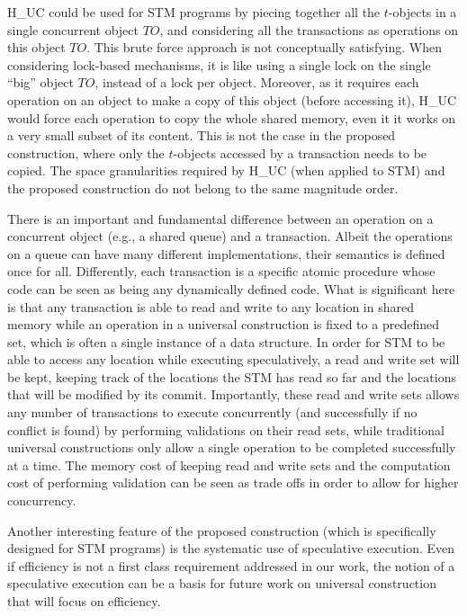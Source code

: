 H\_UC could be used for STM programs   by
piecing together  all the $t$-objects in a single concurrent object 
$\mathit{TO}$,  and  considering   all  the   transactions   as  operations
on this   object 
$\mathit{TO}$.  This  brute force approach is not conceptually satisfying.  
When considering lock-based mechanisms,   it is like using a single lock 
on  the single  ``big'' object $\mathit{TO}$, instead of a lock per object. 
Moreover, as it  requires each operation on an object to make a copy of 
this object   (before  accessing it),  H\_UC would force each  operation to
copy the whole  shared memory, even it  it works on a very  small subset of
its  content.  This is not the case in the proposed  construction, where
only  the $t$-objects accessed by a transaction needs to be copied. 
The space granularities required by  H\_UC (when applied to STM)  and 
the proposed construction do not belong to the same magnitude order.



There is an important and fundamental difference between an operation on 
a concurrent object (e.g.,  a shared queue) and a transaction. 
Albeit the operations on a queue can have many different implementations, 
their semantics is  defined once for all. 
Differently, each transaction is a specific  atomic procedure whose 
code can be  seen as being any dynamically  defined code.
What is significant here is that any transaction is  able to read and
write to  any location in shared  memory while an operation  in a universal
construction is fixed to a predefined set, which is often a single instance
of a  data structure.  In order  for STM to  be able to access 
 any location while executing speculatively,  a read and write set  will be
kept, keeping   track of the  locations  the STM  has read so far  and  the
locations that will be modified by  its commit.  
Importantly, these read  and write sets allows
any number of transactions to  execute concurrently (and successfully if no
conflict is  found) by performing  validations on their read  sets, while
traditional  universal constructions only  allow a  single operation  to be
completed  successfully at a  time.  The  memory cost  of keeping  read and
write sets and the computation cost of performing validation can be seen as
trade offs in order to allow for higher concurrency.   

Another interesting feature of  the proposed construction
(which is specifically designed for STM programs)  
is the  systematic use of  speculative execution.  
Even  if  efficiency is   not a  first class  requirement addressed  in our
work, the notion of a  speculative  execution  can  be  a  basis  for  future
work  on  universal construction  that will focus on efficiency. 





